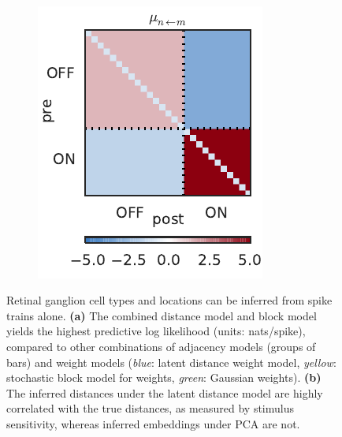 \begin{figure}[t!]
\begin{subfigure}[b]{1.85in}
    \label{fig:rgc_rho}
  \end{subfigure}
  ~
  \begin{subfigure}[b]{1.85in}
    \centering
    \caption{}
    \vspace{-.2in}
    \includegraphics[width=\textwidth]{figures/ch5/rgc_mean_conn.pdf}
    \label{fig:rgc_mu}
  \end{subfigure}
  \vspace{-2em}
  \caption[Retinal ganglion cell types and locations inferred
    from spike trains alone]
          {Retinal ganglion cell types and locations can be inferred
    from spike trains alone.
    \textbf{(a)} The combined distance model and block model yields the highest predictive log likelihood (units: nats/spike), compared to other combinations of adjacency models (groups of bars) and weight models (\textit{blue}: latent distance weight model, \textit{yellow}: stochastic block model for weights, \textit{green}: Gaussian weights).
    \textbf{(b)} The inferred distances under the latent distance model are highly correlated with the true distances, as measured by stimulus sensitivity, whereas inferred embeddings under PCA are not.
}
\end{figure}
